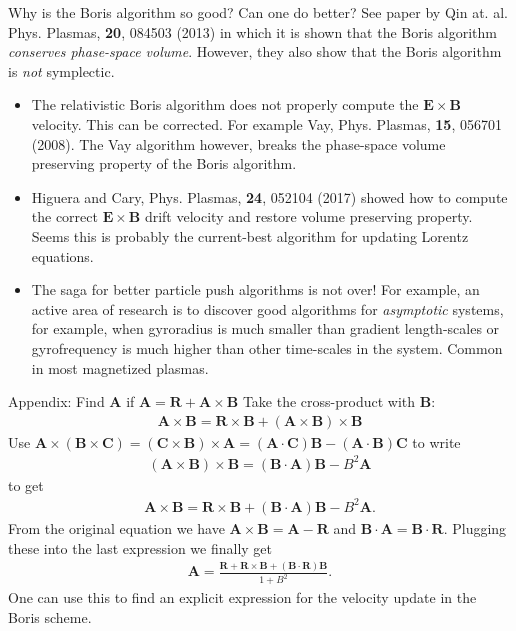 \documentclass[pdf]{beamer}
\newcommand{\mvec}[1]{\mathbf{#1}}
\theoremstyle{definition}
\begin{document}
\begin{frame}{Why is the Boris algorithm so good? Can one do better?}
  \small%
  See paper by Qin at. al. Phys. Plasmas, {\bf 20}, 084503 (2013) in
  which it is shown that the Boris algorithm \emph{conserves
    phase-space volume}. However, they also show that the Boris
  algorithm is \emph{not} symplectic.
  \begin{itemize}
  \item The relativistic Boris algorithm does not properly compute the
    $\mvec{E}\times\mvec{B}$ velocity. This can be corrected. For
    example Vay, Phys. Plasmas, {\bf 15}, 056701 (2008). The Vay
    algorithm however, breaks the phase-space volume preserving
    property of the Boris algorithm.
  \item Higuera and Cary, Phys. Plasmas, {\bf 24}, 052104 (2017)
    showed how to compute the correct $\mvec{E}\times\mvec{B}$ drift
    velocity and restore volume preserving property. Seems this is
    probably the current-best algorithm for updating Lorentz
    equations.
  \item The saga for better particle push algorithms is not over! For
    example, an active area of research is to discover good algorithms
    for \emph{asymptotic} systems, for example, when gyroradius is
    much smaller than gradient length-scales or gyrofrequency is much
    higher than other time-scales in the system. Common in most
    magnetized plasmas.
  \end{itemize}  
\end{frame}


\begin{frame}{Appendix: Find $\mvec{A}$ if
    $\mvec{A} = \mvec{R}+\mvec{A}\times\mvec{B}$}
  \small%
  Take the cross-product with $\mvec{B}$:
  \begin{align*}
    \mvec{A}\times\mvec{B}=\mvec{R}\times\mvec{B}+(\mvec{A}\times\mvec{B})\times\mvec{B}
  \end{align*}
  Use
  $\mvec{A}\times(\mvec{B}\times\mvec{C}) =
  (\mvec{C}\times\mvec{B})\times\mvec{A} =
  (\mvec{A}\cdot\mvec{C})\mvec{B}- (\mvec{A}\cdot\mvec{B})\mvec{C}$ to
  write
  \begin{align*}
    (\mvec{A}\times\mvec{B})\times\mvec{B} = (\mvec{B}\cdot\mvec{A})\mvec{B} - B^2\mvec{A}
  \end{align*}
  to get
  \begin{align*}
    \mvec{A}\times\mvec{B}=\mvec{R}\times\mvec{B}
    +
    (\mvec{B}\cdot\mvec{A})\mvec{B} - B^2\mvec{A}.
  \end{align*}
  From the original equation we have
  $\mvec{A}\times\mvec{B}=\mvec{A}-\mvec{R}$ and
  $\mvec{B}\cdot\mvec{A}=\mvec{B}\cdot\mvec{R}$.  Plugging these into
  the last expression we finally get
  \begin{align*}
    \mvec{A} = \frac{\mvec{R}+\mvec{R}\times\mvec{B} + (\mvec{B}\cdot\mvec{R})\mvec{B}}{1+B^2}.
  \end{align*}
  One can use this to find an explicit expression for the velocity
  update in the Boris scheme.
\end{frame}

\end{document}
